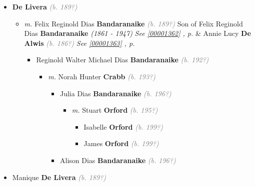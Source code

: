 \documentclass[10pt, openany]{book}
\begin{document}
\begin{itemize}
{\begin{itemize}
{\begin{itemize}
{\begin{itemize}
{\begin{itemize}
{\begin{itemize}
\item{ \textbf{De Livera} \textcolor{gray}{\textit{(b. 189?)}}
\begin{itemize}
\item{\textit{m.} Felix Reginold Dias \textbf{Bandaranaike} \textcolor{gray}{\textit{(b. 189?)}} Son of  Felix Reginold Dias \textbf{Bandaranaike} \textcolor{slorange}{\textit{(1861 - 1947)}} \textcolor{slteal}{\textit{See  \autoref{00001362} \textit{, p. \pageref{00001362} }}}  \&  Annie Lucy  \textbf{De Alwis} \textcolor{gray}{\textit{(b. 186?)}} \textcolor{slteal}{\textit{See  \autoref{00001363} \textit{, p. \pageref{00001363} }}}   \label{couple:00001068:00001069} \begin{itemize}
\item{Reginold Walter Michael Dias \textbf{Bandaranaike} \textcolor{gray}{\textit{(b. 192?)}}
\begin{itemize}
\item{\textit{m.} Norah Hunter \textbf{Crabb} \textcolor{gray}{\textit{(b. 193?)}}   \label{couple:00001070:00001071} \begin{itemize}
\item{Julia Dias \textbf{Bandaranaike} \textcolor{gray}{\textit{(b. 196?)}}
\begin{itemize}
\item{\textit{m.} Stuart \textbf{Orford} \textcolor{gray}{\textit{(b. 195?)}}   \label{couple:00001074:00001075} \begin{itemize}
\item{Isabelle \textbf{Orford} \textcolor{gray}{\textit{(b. 199?)}}
 }
\item{James \textbf{Orford} \textcolor{gray}{\textit{(b. 199?)}}
 }
\end{itemize}}
\end{itemize}
  }
\item{Alison Dias \textbf{Bandaranaike} \textcolor{gray}{\textit{(b. 196?)}}
  }
\end{itemize}}
\end{itemize}
    }
\end{itemize}}
\end{itemize}
  }
\item{Manique \textbf{De Livera} \textcolor{gray}{\textit{(b. 189?)}}
  }

\end{itemize}}
\end{itemize}}
\end{itemize}}
\end{itemize}}
\end{itemize}}
\end{itemize}
\end{document}
